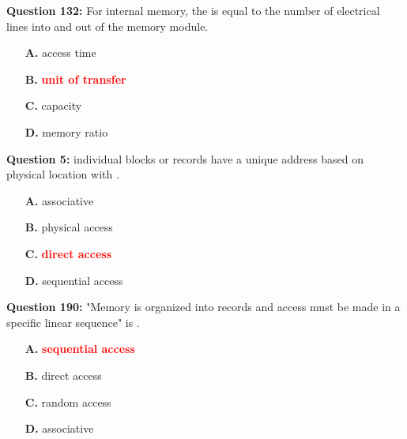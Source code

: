 \documentclass[12pt,a4paper]{article}
\begin{document}
\vspace{0.5cm}

\vspace{0.5cm}

\textbf{Question 132:} For internal memory, the \underline{\hspace{1.5cm}} is equal to the number of electrical lines into and out of the memory module.

\begin{itemize}
    \item[\textbf{A.}] access time
    \item[\textbf{B.}] \textcolor{red}{\textbf{unit of transfer}}
    \item[\textbf{C.}] capacity
    \item[\textbf{D.}] memory ratio
\end{itemize}

\vspace{0.5cm}

\vspace{0.5cm}

\textbf{Question 5:} individual blocks or records have a unique address based on physical location with \underline{\hspace{1.5cm}}.

\begin{itemize}
    \item[\textbf{A.}] associative
    \item[\textbf{B.}] physical access
    \item[\textbf{C.}] \textcolor{red}{\textbf{direct access}}
    \item[\textbf{D.}] sequential access
\end{itemize}

\vspace{0.5cm}

\vspace{0.5cm}

\textbf{Question 190:} "Memory is organized into records and access must be made in a specific linear sequence" is \underline{\hspace{1.5cm}}.

\begin{itemize}
    \item[\textbf{A.}] \textcolor{red}{\textbf{sequential access}}
    \item[\textbf{B.}] direct access
    \item[\textbf{C.}] random access
    \item[\textbf{D.}] associative
\end{itemize}
\end{document}
